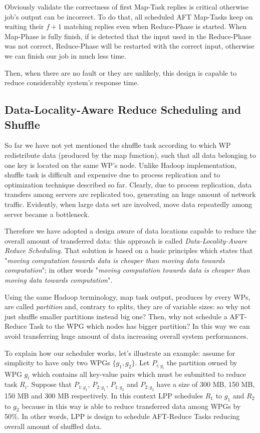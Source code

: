 \documentclass[sigchi]{acmart}
\begin{document}
Obviously validate the correctness of first Map-Task replies is critical otherwise job's output can be incorrect. To do that, all scheduled AFT Map-Tasks keep on waiting their $f + 1$ matching replies even when Reduce-Phase is started. When Map-Phase is fully finish, if is detected that the input used in the Reduce-Phase was not correct, Reduce-Phase will be restarted with the correct input, otherwise we can finish our job in much less time.

Then, when there are no fault or they are unlikely, this design is capable to reduce considerably system's response time. 

\subsection{Data-Locality-Aware Reduce Scheduling and Shuffle}

So far we have not yet mentioned the shuffle task according to which WP redistribute data (produced by the map function), such that all data belonging to one key is located on the same WP's node. Unlike Hadoop implementation, shuffle task is difficult and expensive due to process replication and to optimization technique described so far. Clearly, due to process replication, data transfers among servers are replicated too, generating an huge amount of network traffic. Evidently, when large data set are involved, move data repeatedly among server became a bottleneck. 

Therefore we have adopted a design aware of data locations capable to reduce the overall amount of transferred data: this approach is called \textit{Data-Locality-Aware Reduce Scheduling}. That solution is based on a basic principles which states that "\textit{moving computation towards data is cheaper than moving data towards computation}"; in other words  "\textit{moving computation towards data is cheaper than moving data towards computation}".

Using the same Hadoop terminology, map task output, produces by every WPs, are called \textit{partition} and, contrary to splits, they are of variable sizes: so why not just shuffle smaller partitions instead big one? Then, why not schedule a AFT-Reduce Task to the WPG which nodes has bigger partition? In this way we can avoid transferring huge amount of data increasing overall system performances.

To explain how our scheduler works, let's illustrate an example: assume for simplicity to have only two WPGs $\lbrace g_1, g_2 \rbrace$. Let $P_{i:g_i}$ the partition owned by WPG $g_i$ which contains all key-value pairs which must be submitted to reduce task $R_i$. Suppose that $P_{1:g_1}$, $P_{2:g_1}$, $P_{1:g_2}$ and $P_{2:g_2}$ have a size of 300 MB, 150 MB, 150 MB and 300 MB respectively. In this context LPP schedules $R_1$ to $g_1$ and $R_2$ to $g_2$ because in this way is able to reduce transferred data among WPGs by 50\%. In other words, LPP is design to schedule AFT-Reduce Tasks reducing overall amount of shuffled data.
\end{document}
